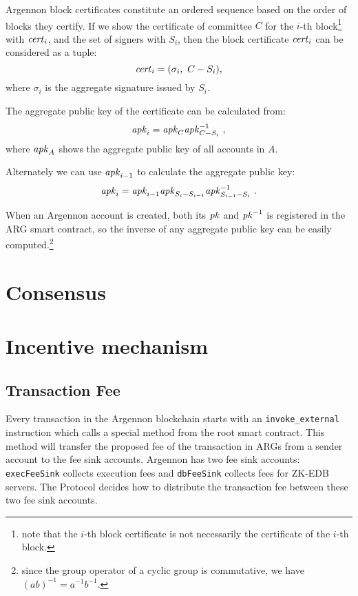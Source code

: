 Argennon block certificates constitute an ordered sequence based on the order of blocks they certify. If we show
the certificate of committee $C$ for the $i$-th block\footnote{note that the $i$-th block certificate is not
necessarily the certificate of the $i$-th block.} with $\mathit{cert}_i$, and the set of signers
with $S_i$, then the block certificate $\mathit{cert}_i$ can be considered as a tuple:
\begin{equation}
    \C_i=(\sigma_i,\ C-S_{i})\label{eq:cert},
\end{equation}
where $\sigma_i$ is the aggregate signature issued by $S_i$.

The aggregate public key of the certificate can
be calculated from:
\begin{equation}
    \APK_i=\APK_C\APK_{C-S_i}^{-1}\label{eq:aggCertPK}\ ,
\end{equation}
where $\mathit{apk}_{A}$ shows the aggregate public key of all accounts in $A$.

Alternately we can use $\mathit{apk}_{i-1}$ to calculate the aggregate public key:
\begin{equation}
    \APK_i=\APK_{i-1}\APK_{S_i-S_{i-1}}\APK_{S_{i-1}-S_i}^{-1}\ .\label{eq:aggPK-2}
\end{equation}

When an Argennon account is created, both its $\mathit{pk}$ and $\mathit{pk}^{-1}$ is registered in the ARG smart contract, so the
inverse of any aggregate public key can be easily computed.\footnote{since the group operator of a cyclic
group is commutative, we have $(ab)^{-1}=a^{-1}b^{-1}$.}

\section{Consensus}\label{sec:consensus}


\section{Incentive mechanism}\label{sec:incentive-mechanism}


\subsection{Transaction Fee}\label{subsec:transaction-fee}

Every transaction in the Argennon blockchain starts with an \texttt{invoke\_external} instruction which calls a
special method from the root smart contract. This method will transfer the proposed fee of the transaction in ARGs
from a sender account to the fee sink accounts. Argennon has two fee sink accounts: \texttt{execFeeSink} collects
execution fees and \texttt{dbFeeSink} collects fees for ZK-EDB servers. The Protocol decides how to distribute the
transaction fee between these two fee sink accounts.

